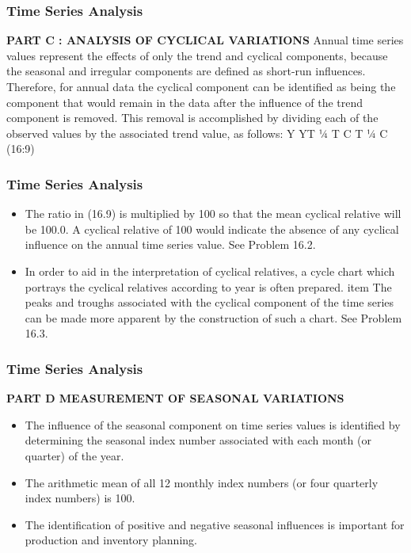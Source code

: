 
\begin{frame}
\frametitle{Time Series Analysis}
\textbf{PART C : ANALYSIS OF CYCLICAL VARIATIONS}
Annual time series values represent the effects of only the trend and cyclical components, because the
seasonal and irregular components are defined as short-run influences. Therefore, for annual data the
cyclical component can be identified as being the component that would remain in the data after the influence of
the trend component is removed. This removal is accomplished by dividing each of the observed values by the
associated trend value, as follows:
Y
YT
¼
T   C
T
¼ C (16:9)
\end{frame}
\begin{frame}
\frametitle{Time Series Analysis}
\begin{itemize}
\item The ratio in (16.9) is multiplied by 100 so that the mean cyclical relative will be 100.0. A cyclical relative
of 100 would indicate the absence of any cyclical influence on the annual time series value. See Problem 16.2.
\item In order to aid in the interpretation of cyclical relatives, a cycle chart which portrays the cyclical relatives
according to year is often prepared. 
item The peaks and troughs associated with the cyclical component of the time
series can be made more apparent by the construction of such a chart. See Problem 16.3.
\end{itemize}
\end{frame}
\begin{frame}
\frametitle{Time Series Analysis}
\textbf{PART D  MEASUREMENT OF SEASONAL VARIATIONS}
\begin{itemize}
\item The influence of the seasonal component on time series values is identified by determining the seasonal
index number associated with each month (or quarter) of the year. 
\item The arithmetic mean of all 12 monthly index
numbers (or four quarterly index numbers) is 100. 
\item The identification of positive and negative seasonal
influences is important for production and inventory planning.
\end{itemize}
\end{frame}

